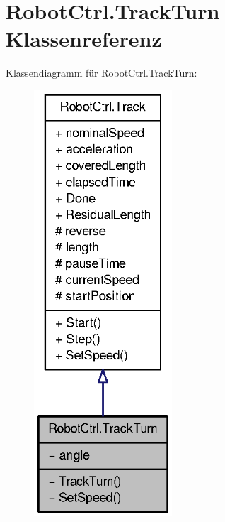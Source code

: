 \hypertarget{class_robot_ctrl_1_1_track_turn}{
\section{RobotCtrl.TrackTurn Klassenreferenz}
\label{class_robot_ctrl_1_1_track_turn}
}


Klassendiagramm für RobotCtrl.TrackTurn:\nopagebreak
\begin{figure}[H]
\begin{center}
\leavevmode
\includegraphics[width=146pt]{class_robot_ctrl_1_1_track_turn__inherit__graph}
\end{center}
\end{figure}


